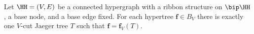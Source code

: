 \begin{theo}
\label{t:hypertrees_unique_repr_by_J_trees}
Let $\HH=(V,E)$ be a connected hypergraph with a ribbon structure on $\bip\HH$, a base node, and a base edge fixed. For each hypertree $\mathbf f\in B_V$ there is exactly one $V$-cut Jaeger tree $T$ such that $\mathbf f=\mathbf f_V(T)$.
\end{theo}